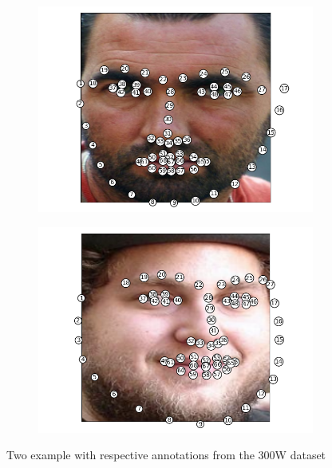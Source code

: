 \begin{figure}
    \begin{subfigure}{.5\textwidth}
        \centering
        \includegraphics[width=.9\linewidth]{figs/sample1.png}
    \end{subfigure}
    \begin{subfigure}{.5\textwidth}
        \centering
        \includegraphics[width=.9\linewidth]{figs/sample2.png}
    \end{subfigure}
    \caption{Two example with respective annotations from the 300W dataset}
    \label{img:sample}
\end{figure}


